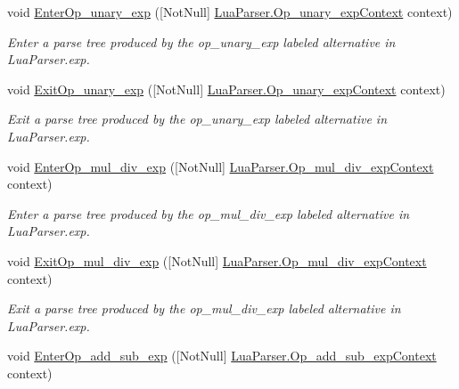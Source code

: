 \begin{DoxyCompactItemize}
void \mbox{\hyperlink{interfacezlua_1_1_i_lua_listener_ab264dde9b798933c740a470090b2db94}{Enter\+Op\+\_\+unary\+\_\+exp}} (\mbox{[}Not\+Null\mbox{]} \mbox{\hyperlink{classzlua_1_1_lua_parser_1_1_op__unary__exp_context}{Lua\+Parser.\+Op\+\_\+unary\+\_\+exp\+Context}} context)
\begin{DoxyCompactList}\small\item\em Enter a parse tree produced by the {\ttfamily op\+\_\+unary\+\_\+exp} labeled alternative in Lua\+Parser.\+exp. \end{DoxyCompactList}\item 
void \mbox{\hyperlink{interfacezlua_1_1_i_lua_listener_a16b9b227b375c5bbe949db6e101f2dce}{Exit\+Op\+\_\+unary\+\_\+exp}} (\mbox{[}Not\+Null\mbox{]} \mbox{\hyperlink{classzlua_1_1_lua_parser_1_1_op__unary__exp_context}{Lua\+Parser.\+Op\+\_\+unary\+\_\+exp\+Context}} context)
\begin{DoxyCompactList}\small\item\em Exit a parse tree produced by the {\ttfamily op\+\_\+unary\+\_\+exp} labeled alternative in Lua\+Parser.\+exp. \end{DoxyCompactList}\item 
void \mbox{\hyperlink{interfacezlua_1_1_i_lua_listener_adceb73b6f7d7f84737f72b1a5c5fe4d6}{Enter\+Op\+\_\+mul\+\_\+div\+\_\+exp}} (\mbox{[}Not\+Null\mbox{]} \mbox{\hyperlink{classzlua_1_1_lua_parser_1_1_op__mul__div__exp_context}{Lua\+Parser.\+Op\+\_\+mul\+\_\+div\+\_\+exp\+Context}} context)
\begin{DoxyCompactList}\small\item\em Enter a parse tree produced by the {\ttfamily op\+\_\+mul\+\_\+div\+\_\+exp} labeled alternative in Lua\+Parser.\+exp. \end{DoxyCompactList}\item 
void \mbox{\hyperlink{interfacezlua_1_1_i_lua_listener_a25a0b962824e954f08d1dc84e4e4d13d}{Exit\+Op\+\_\+mul\+\_\+div\+\_\+exp}} (\mbox{[}Not\+Null\mbox{]} \mbox{\hyperlink{classzlua_1_1_lua_parser_1_1_op__mul__div__exp_context}{Lua\+Parser.\+Op\+\_\+mul\+\_\+div\+\_\+exp\+Context}} context)
\begin{DoxyCompactList}\small\item\em Exit a parse tree produced by the {\ttfamily op\+\_\+mul\+\_\+div\+\_\+exp} labeled alternative in Lua\+Parser.\+exp. \end{DoxyCompactList}\item 
void \mbox{\hyperlink{interfacezlua_1_1_i_lua_listener_a1633c1d8de4e31ea48b020df3c5dba75}{Enter\+Op\+\_\+add\+\_\+sub\+\_\+exp}} (\mbox{[}Not\+Null\mbox{]} \mbox{\hyperlink{classzlua_1_1_lua_parser_1_1_op__add__sub__exp_context}{Lua\+Parser.\+Op\+\_\+add\+\_\+sub\+\_\+exp\+Context}} context)

\end{DoxyCompactItemize}
